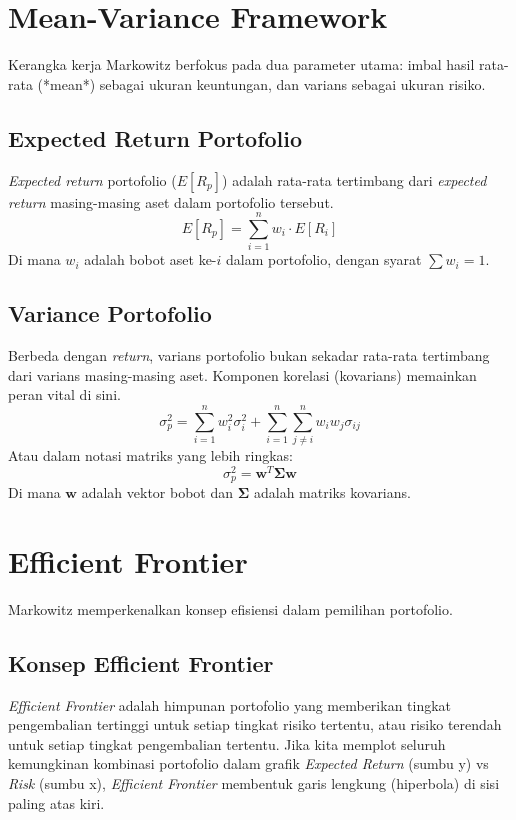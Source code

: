 \documentclass[12pt,a4paper]{book}
\begin{document}
\section{Mean-Variance Framework}
Kerangka kerja Markowitz berfokus pada dua parameter utama: imbal hasil rata-rata (*mean*) sebagai ukuran keuntungan, dan varians sebagai ukuran risiko.

\subsection{Expected Return Portofolio}
\textit{Expected return} portofolio ($E[R_p]$) adalah rata-rata tertimbang dari \textit{expected return} masing-masing aset dalam portofolio tersebut.
\begin{equation}
    E[R_p] = \sum_{i=1}^{n} w_i \cdot E[R_i]
\end{equation}
Di mana $w_i$ adalah bobot aset ke-$i$ dalam portofolio, dengan syarat $\sum w_i = 1$.

\subsection{Variance Portofolio}
Berbeda dengan \textit{return}, varians portofolio bukan sekadar rata-rata tertimbang dari varians masing-masing aset. Komponen korelasi (kovarians) memainkan peran vital di sini.
\begin{equation}
    \sigma_p^2 = \sum_{i=1}^{n} w_i^2 \sigma_i^2 + \sum_{i=1}^{n} \sum_{j \neq i}^{n} w_i w_j \sigma_{ij}
\end{equation}
Atau dalam notasi matriks yang lebih ringkas:
\begin{equation}
    \sigma_p^2 = \mathbf{w}^T \mathbf{\Sigma} \mathbf{w}
\end{equation}
Di mana $\mathbf{w}$ adalah vektor bobot dan $\mathbf{\Sigma}$ adalah matriks kovarians.

\section{Efficient Frontier}
Markowitz memperkenalkan konsep efisiensi dalam pemilihan portofolio.

\subsection{Konsep Efficient Frontier}
\textit{Efficient Frontier} adalah himpunan portofolio yang memberikan tingkat pengembalian tertinggi untuk setiap tingkat risiko tertentu, atau risiko terendah untuk setiap tingkat pengembalian tertentu. Jika kita memplot seluruh kemungkinan kombinasi portofolio dalam grafik \textit{Expected Return} (sumbu y) vs \textit{Risk} (sumbu x), \textit{Efficient Frontier} membentuk garis lengkung (hiperbola) di sisi paling atas kiri.
\end{document}
